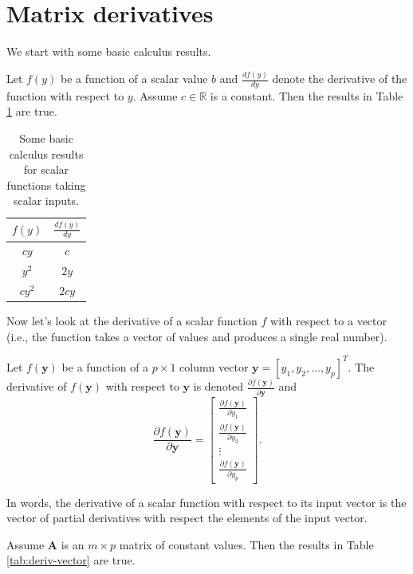 \documentclass[
]{book}
\theoremstyle{definition}
\theoremstyle{definition}
\theoremstyle{definition}
\theoremstyle{definition}
\theoremstyle{remark}
\begin{document}
\hypertarget{matrix-derivatives}{%
\section{Matrix derivatives}\label{matrix-derivatives}}

We start with some basic calculus results.

Let \(f(y)\) be a function of a scalar value \(b\) and \(\frac{df(y)}{dy}\) denote the derivative of the function with respect to \(y\). Assume \(c \in \mathbb{R}\) is a constant. Then the results in Table \ref{tab:deriv-scalar} are true.

\begin{table}

\caption{\label{tab:unnamed-chunk-167}Some basic calculus results for scalar functions taking scalar inputs.\label{tab:deriv-scalar}}
\centering
\begin{tabular}[t]{c|c}
\hline
$f(y)$ & $\frac{df(y)}{dy}$\\
\hline
$cy$ & $c$\\
\hline
$y^2$ & $2y$\\
\hline
$c y^2$ & $2cy$\\
\hline
\end{tabular}
\end{table}

Now let's look at the derivative of a scalar function \(f\) with respect to a vector (i.e., the function takes a vector of values and produces a single real number).

Let \(f(\mathbf{y})\) be a function of a \(p\times 1\) column vector \(\mathbf{y}=[y_1, y_2, \ldots, y_p]^T\). The derivative of \(f(\mathbf{y})\) with respect to \(\mathbf{y}\) is denoted \(\frac{\partial f(\mathbf{y})}{\partial \mathbf{y}}\) and
\[
\frac{\partial f(\mathbf{y})}{\partial \mathbf{y}} = \begin{bmatrix}
\frac{\partial f(\mathbf{y})}{\partial y_1}\\
\frac{\partial f(\mathbf{y})}{\partial y_2}\\
\vdots \\
\frac{\partial f(\mathbf{y})}{\partial y_p}
\end{bmatrix}.
\]

In words, the derivative of a scalar function with respect to its input vector is the vector of partial derivatives with respect the elements of the input vector.

Assume \(\mathbf{A}\) is an \(m\times p\) matrix of constant values. Then the results in Table \ref{tab:deriv-vector} are true.
\end{document}
